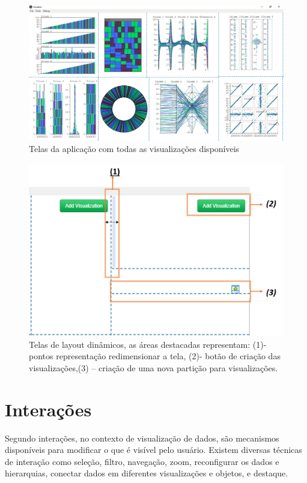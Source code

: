 \documentclass[
	12pt,				%
	openright,			%
	oneside,			%
	a4paper,			%
	english,			%
	brazil				%
	]{abntex2}
\begin{document}
\begin{figure}[!htb]
	\caption{\label{visualizations} Telas da aplicação com todas as visualizações disponíveis
}
	\begin{center}
	    \includegraphics[width=\textwidth,size=1]{figures/Capturar1.PNG}
	\end{center}
\end{figure}


\begin{figure}[!htb]
	\caption{\label{layout_resize} Telas de layout dinâmicos, as áreas destacadas representam: (1)- pontos representação redimensionar a tela, (2)- botão de criação das visualizações,(3) – criação de uma nova partição para visualizações.
}
	\begin{center}
	    \includegraphics[width=30pc,scale=1]{figures/layouts.png}
	\end{center}
\end{figure}

\section{Interações}
Segundo \cite{ward2010interactive} interações, no contexto de visualização de dados, são mecanismos disponíveis para modificar o que é visível pelo usuário. Existem diversas técnicas de interação como seleção, filtro, navegação, zoom, reconfigurar os dados e hierarquias, conectar dados em diferentes visualizações e objetos, e destaque. 
\end{document}
